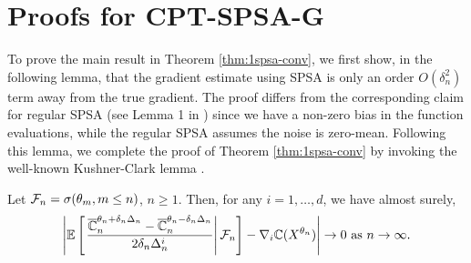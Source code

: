 \documentclass{article}
\numberwithin{equation}{section}
\numberwithin{theorem}{section}
\begin{document}
\section{Proofs for CPT-SPSA-G}
\label{appendix:1spsa}

To prove the main result in Theorem \ref{thm:1spsa-conv}, we first show, in the following lemma, that the gradient estimate using SPSA is only an order $O(\delta_n^2)$ term away from the true gradient. The proof differs from the corresponding claim for regular SPSA (see Lemma 1 in \cite{spall}) since we have a non-zero bias in the function evaluations, while the regular SPSA assumes the noise is zero-mean. Following this lemma, we complete the proof of Theorem \ref{thm:1spsa-conv} by invoking the well-known Kushner-Clark lemma \cite{kushner-clark}.

\begin{lemma}
\label{lemma:1spsa-bias}
Let $\mathcal{F}_n = \sigma(\theta_m,m\le n)$, $n\ge 1$.
Then, for any $i = 1,\ldots,d$, we have almost surely,  
\begin{align}
\left| \mathbb{E}\left[\left.\dfrac{\overline {\mathbb{C}}_n^{\theta_n+\delta_n \Delta_n} -\overline {\mathbb{C}}_n^{\theta_n-\delta_n \Delta_n}}{2 \delta_n \Delta_n^{i}}\right| \mathcal{F}_n \right] - \nabla_i \mathbb{C}(X^{\theta_n}) \right| \rightarrow 0 \text{ as } n\rightarrow\infty.
\end{align} 
\end{lemma}
\end{document}
